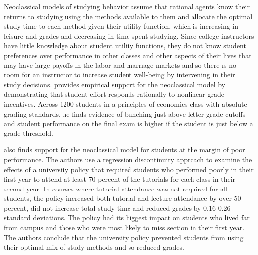\documentclass[12pt]{article}
\begin{document}
Neoclassical models of studying behavior assume that rational agents know their returns to studying using the methods available to them and allocate the optimal study time to each method given their utility function, which is increasing in leisure and grades and decreasing in time spent studying. Since college instructors have little knowledge about student utility functions, they do not know student preferences over performance in other classes and other aspects of their lives that may have large payoffs in the labor and marriage markets and so there is no room for an instructor to increase student well-being by intervening in their study decisions. \textcite{oettinger2002} provides empirical support for the neoclassical model by demonstrating that student effort responds rationally to nonlinear grade incentives. Across 1200 students in a principles of economics class with absolute grading standards, he finds evidence of bunching just above letter grade cutoffs and student performance on the final exam is higher if the student is just below a grade threshold.

\textcite{kow2020} also finds support for the neoclassical model for students at the margin of poor performance. The authors use a regression discontinuity approach to examine the effects of a university policy that required students who performed poorly in their first year to attend at least 70 percent of the tutorials for each class in their second year. In courses where tutorial attendance was not required for all students, the policy increased both tutorial and lecture attendance by over 50 percent, did not increase total study time and reduced grades by 0.16-0.26 standard deviations. The policy had its biggest impact on students who lived far from campus and those who were most likely to miss section in their first year. The authors conclude that the university policy prevented students from using their optimal mix of study methods and so reduced grades.
\end{document}
